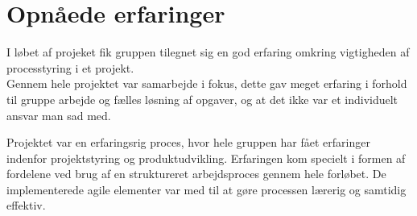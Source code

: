 \section{Opnåede erfaringer}
I løbet af projeket fik gruppen tilegnet sig en god erfaring omkring vigtigheden af processtyring i et projekt.\\
Gennem hele projektet var samarbejde i fokus, dette gav meget erfaring i forhold til gruppe arbejde og fælles løsning af opgaver, og at det ikke var et individuelt ansvar man sad med.

Projektet var en erfaringsrig proces, hvor hele gruppen har fået erfaringer indenfor projektstyring og produktudvikling. Erfaringen kom specielt i formen af fordelene ved brug af en struktureret arbejdsproces gennem hele forløbet. De implementerede agile elementer var med til at gøre processen lærerig og samtidig effektiv.


